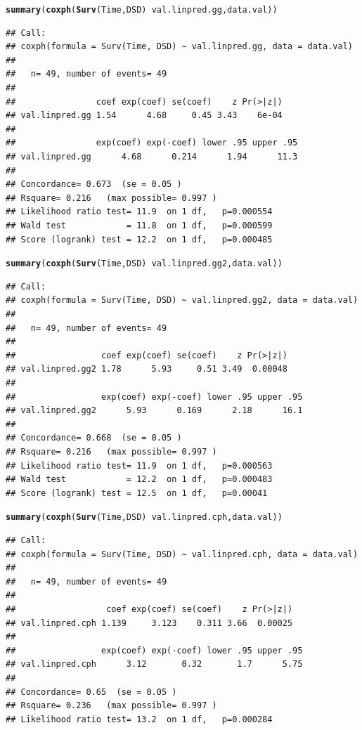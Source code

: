 \documentclass{article}\usepackage[]{graphicx}\usepackage[]{color}
\makeatletter
\newcommand{\hlopt}[1]{\textcolor[rgb]{0,0,0}{#1}}%
\newcommand{\hlstd}[1]{\textcolor[rgb]{0.345,0.345,0.345}{#1}}%
\newcommand{\hlkwd}[1]{\textcolor[rgb]{0.737,0.353,0.396}{\textbf{#1}}}%
\newenvironment{kframe}{%
 \def\at@end@of@kframe{}%
 \ifinner\ifhmode%
  \def\at@end@of@kframe{\end{minipage}}%
  \begin{minipage}{\columnwidth}%
 \fi\fi%
 \def\FrameCommand##1{\hskip\@totalleftmargin \hskip-\fboxsep
 \colorbox{shadecolor}{##1}\hskip-\fboxsep
     \hskip-\linewidth \hskip-\@totalleftmargin \hskip\columnwidth}%
 \MakeFramed {\advance\hsize-\width
   \@totalleftmargin\z@ \linewidth\hsize
   \@setminipage}}%
 {\par\unskip\endMakeFramed%
 \at@end@of@kframe}
\newenvironment{knitrout}{}{} %
\makeatother
\begin{document}
\begin{knitrout}
\begin{kframe}
\begin{alltt}
\hlkwd{summary}\hlstd{(}\hlkwd{coxph}\hlstd{(}\hlkwd{Surv}\hlstd{(Time, DSD)} \hlopt{~} \hlstd{val.linpred.gg, data.val))}
\end{alltt}
\begin{verbatim}
## Call:
## coxph(formula = Surv(Time, DSD) ~ val.linpred.gg, data = data.val)
## 
##   n= 49, number of events= 49 
## 
##                coef exp(coef) se(coef)    z Pr(>|z|)
## val.linpred.gg 1.54      4.68     0.45 3.43    6e-04
## 
##                exp(coef) exp(-coef) lower .95 upper .95
## val.linpred.gg      4.68      0.214      1.94      11.3
## 
## Concordance= 0.673  (se = 0.05 )
## Rsquare= 0.216   (max possible= 0.997 )
## Likelihood ratio test= 11.9  on 1 df,   p=0.000554
## Wald test            = 11.8  on 1 df,   p=0.000599
## Score (logrank) test = 12.2  on 1 df,   p=0.000485
\end{verbatim}
\begin{alltt}
\hlkwd{summary}\hlstd{(}\hlkwd{coxph}\hlstd{(}\hlkwd{Surv}\hlstd{(Time, DSD)} \hlopt{~} \hlstd{val.linpred.gg2, data.val))}
\end{alltt}
\begin{verbatim}
## Call:
## coxph(formula = Surv(Time, DSD) ~ val.linpred.gg2, data = data.val)
## 
##   n= 49, number of events= 49 
## 
##                 coef exp(coef) se(coef)    z Pr(>|z|)
## val.linpred.gg2 1.78      5.93     0.51 3.49  0.00048
## 
##                 exp(coef) exp(-coef) lower .95 upper .95
## val.linpred.gg2      5.93      0.169      2.18      16.1
## 
## Concordance= 0.668  (se = 0.05 )
## Rsquare= 0.216   (max possible= 0.997 )
## Likelihood ratio test= 11.9  on 1 df,   p=0.000563
## Wald test            = 12.2  on 1 df,   p=0.000483
## Score (logrank) test = 12.5  on 1 df,   p=0.00041
\end{verbatim}
\begin{alltt}
\hlkwd{summary}\hlstd{(}\hlkwd{coxph}\hlstd{(}\hlkwd{Surv}\hlstd{(Time, DSD)} \hlopt{~} \hlstd{val.linpred.cph, data.val))}
\end{alltt}
\begin{verbatim}
## Call:
## coxph(formula = Surv(Time, DSD) ~ val.linpred.cph, data = data.val)
## 
##   n= 49, number of events= 49 
## 
##                  coef exp(coef) se(coef)    z Pr(>|z|)
## val.linpred.cph 1.139     3.123    0.311 3.66  0.00025
## 
##                 exp(coef) exp(-coef) lower .95 upper .95
## val.linpred.cph      3.12       0.32       1.7      5.75
## 
## Concordance= 0.65  (se = 0.05 )
## Rsquare= 0.236   (max possible= 0.997 )
## Likelihood ratio test= 13.2  on 1 df,   p=0.000284

\end{verbatim}
\end{kframe}
\end{knitrout}
\end{document}

